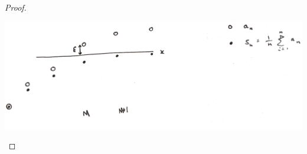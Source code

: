 \documentclass[12pt]{article}
\begin{document}
\begin{proof}
\begin{mdframed}
\includegraphics[width=400pt]{img/misc--cambridge-1a-2017-1-3f-diagram.png}
\end{mdframed}












\end{proof}
\end{document}
